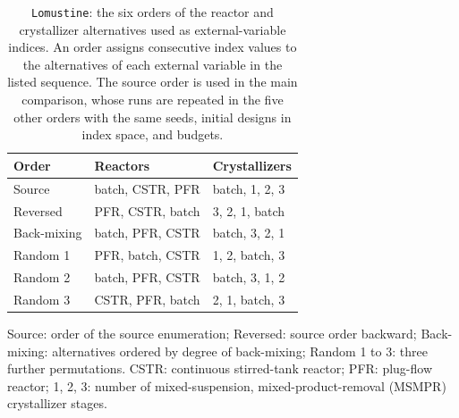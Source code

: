 \begin{table}[htbp]
\centering
\caption{\texttt{Lomustine}: the six orders of the reactor and crystallizer alternatives used as external-variable indices.
An order assigns consecutive index values to the alternatives of each external variable in the listed sequence.
The source order is used in the main comparison, whose runs are repeated in the five other orders with the same seeds, initial designs in index space, and budgets.}
\label{tab:supp-lomustine-orders}
\footnotesize
\begin{threeparttable}
\begin{tabular}{@{}lll@{}}\toprule
Order & Reactors & Crystallizers\\\midrule
Source & batch, CSTR, PFR & batch, 1, 2, 3 \\
Reversed & PFR, CSTR, batch & 3, 2, 1, batch \\
Back-mixing & batch, PFR, CSTR & batch, 3, 2, 1 \\
Random 1 & PFR, batch, CSTR & 1, 2, batch, 3 \\
Random 2 & batch, PFR, CSTR & batch, 3, 1, 2 \\
Random 3 & CSTR, PFR, batch & 2, 1, batch, 3 \\
\bottomrule
\end{tabular}
\begin{tablenotes}[flushleft]\footnotesize
\item Source: order of the source enumeration; Reversed: source order backward; Back-mixing: alternatives ordered by degree of back-mixing; Random 1 to 3: three further permutations.
CSTR: continuous stirred-tank reactor; PFR: plug-flow reactor; 1, 2, 3: number of mixed-suspension, mixed-product-removal (MSMPR) crystallizer stages.
\end{tablenotes}
\end{threeparttable}
\end{table}

